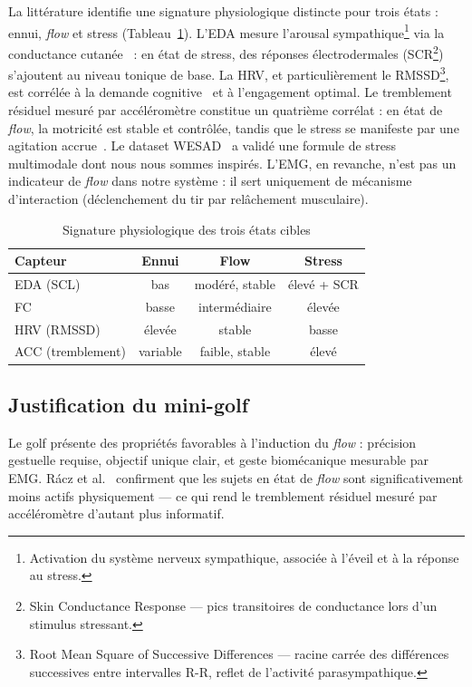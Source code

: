 \documentclass[runningheads]{llncs}
\begin{document}
La littérature identifie une signature physiologique distincte pour trois états :
ennui, \textit{flow} et stress (Tableau~\ref{tab:physiologie}).
L'EDA mesure l'arousal sympathique\footnote{Activation du système nerveux
sympathique, associée à l'éveil et à la réponse au stress.} via la conductance
cutanée~\cite{shi2007} : en état de stress, des réponses électrodermales
(SCR\footnote{Skin Conductance Response — pics transitoires de conductance
lors d'un stimulus stressant.}) s'ajoutent au niveau tonique de base.
La HRV, et particulièrement le RMSSD\footnote{Root Mean Square of Successive
Differences — racine carrée des différences successives entre intervalles R-R,
reflet de l'activité parasympathique.}, est corrélée à la demande
cognitive~\cite{luft2009} et à l'engagement optimal. Le tremblement
résiduel mesuré par accéléromètre constitue un quatrième corrélat : en état
de \textit{flow}, la motricité est stable et contrôlée, tandis que le stress
se manifeste par une agitation accrue~\cite{racz2025}. Le dataset
WESAD~\cite{wesad2018} a validé une formule de stress multimodale dont
nous nous sommes inspirés. L'EMG, en revanche, n'est pas un indicateur
de \textit{flow} dans notre système : il sert uniquement de mécanisme
d'interaction (déclenchement du tir par relâchement musculaire).

\begin{table}[h]
\centering
\caption{Signature physiologique des trois états cibles}
\label{tab:physiologie}
\begin{tabular}{lccc}
\hline
Capteur & Ennui & Flow & Stress \\
\hline
EDA (SCL)         & bas      & modéré, stable  & élevé + SCR \\
FC                & basse    & intermédiaire   & élevée \\
HRV (RMSSD)       & élevée   & stable          & basse \\
ACC (tremblement) & variable & faible, stable  & élevé \\
\hline
\end{tabular}
\end{table}

\subsection{Justification du mini-golf}

Le golf présente des propriétés favorables à l'induction du \textit{flow} :
précision gestuelle requise, objectif unique clair, et geste biomécanique
mesurable par EMG. Rácz et al.~\cite{racz2025} confirment que les sujets en
état de \textit{flow} sont significativement moins actifs physiquement — ce
qui rend le tremblement résiduel mesuré par accéléromètre d'autant plus
informatif.
\end{document}
